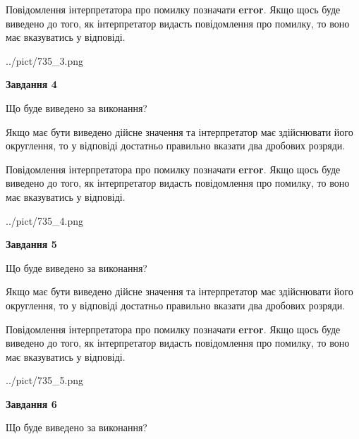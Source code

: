 \documentclass[12pt, ukrainian]{article}
\begin{document}
{\begin {Large}
Повідомлення інтерпретатора про помилку позначати \textbf{error}.
Якщо щось буде виведено до того, як інтерпретатор видасть повідомлення про помилку, 
то воно має вказуватись у відповіді. \par

\begin{center}
	{../pict/735_3.png}
\end{center}
\newpage

{\begin {center}\textbf{Завдання 4}\end {center}}\par
Що буде виведено за виконання? \par

Якщо має бути виведено дійсне значення та інтерпретатор має здійснювати його округлення, 
то у відповіді достатньо правильно вказати два дробових розряди.

Повідомлення інтерпретатора про помилку позначати \textbf{error}.
Якщо щось буде виведено до того, як інтерпретатор видасть повідомлення про помилку, 
то воно має вказуватись у відповіді. \par

\begin{center}
	{../pict/735_4.png}
\end{center}
\newpage

{\begin {center}\textbf{Завдання 5}\end {center}}\par
Що буде виведено за виконання? \par

Якщо має бути виведено дійсне значення та інтерпретатор має здійснювати його округлення, 
то у відповіді достатньо правильно вказати два дробових розряди.

Повідомлення інтерпретатора про помилку позначати \textbf{error}.
Якщо щось буде виведено до того, як інтерпретатор видасть повідомлення про помилку, 
то воно має вказуватись у відповіді. \par

\begin{center}
	{../pict/735_5.png}
\end{center}
\newpage

{\begin {center}\textbf{Завдання 6}\end {center}}\par
Що буде виведено за виконання? \par


\end{Large}}
\end{document}
